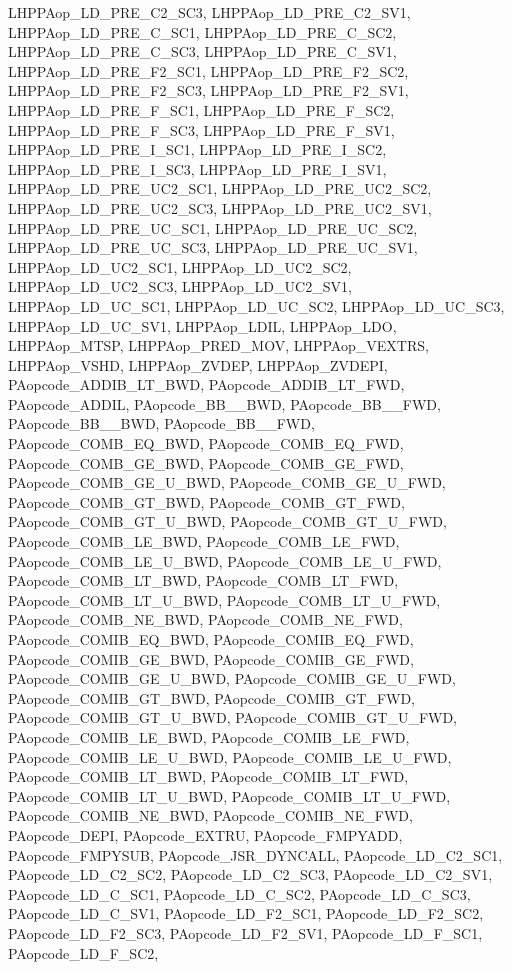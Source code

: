 LHPPAop\_\-LD\_\-PRE\_\-C2\_\-SC3, LHPPAop\_\-LD\_\-PRE\_\-C2\_\-SV1, LHPPAop\_\-LD\_\-PRE\_\-C\_\-SC1, LHPPAop\_\-LD\_\-PRE\_\-C\_\-SC2, LHPPAop\_\-LD\_\-PRE\_\-C\_\-SC3, LHPPAop\_\-LD\_\-PRE\_\-C\_\-SV1, LHPPAop\_\-LD\_\-PRE\_\-F2\_\-SC1, LHPPAop\_\-LD\_\-PRE\_\-F2\_\-SC2, LHPPAop\_\-LD\_\-PRE\_\-F2\_\-SC3, LHPPAop\_\-LD\_\-PRE\_\-F2\_\-SV1, LHPPAop\_\-LD\_\-PRE\_\-F\_\-SC1, LHPPAop\_\-LD\_\-PRE\_\-F\_\-SC2, LHPPAop\_\-LD\_\-PRE\_\-F\_\-SC3, LHPPAop\_\-LD\_\-PRE\_\-F\_\-SV1, LHPPAop\_\-LD\_\-PRE\_\-I\_\-SC1, LHPPAop\_\-LD\_\-PRE\_\-I\_\-SC2, LHPPAop\_\-LD\_\-PRE\_\-I\_\-SC3, LHPPAop\_\-LD\_\-PRE\_\-I\_\-SV1, LHPPAop\_\-LD\_\-PRE\_\-UC2\_\-SC1, LHPPAop\_\-LD\_\-PRE\_\-UC2\_\-SC2, LHPPAop\_\-LD\_\-PRE\_\-UC2\_\-SC3, LHPPAop\_\-LD\_\-PRE\_\-UC2\_\-SV1, LHPPAop\_\-LD\_\-PRE\_\-UC\_\-SC1, LHPPAop\_\-LD\_\-PRE\_\-UC\_\-SC2, LHPPAop\_\-LD\_\-PRE\_\-UC\_\-SC3, LHPPAop\_\-LD\_\-PRE\_\-UC\_\-SV1, LHPPAop\_\-LD\_\-UC2\_\-SC1, LHPPAop\_\-LD\_\-UC2\_\-SC2, LHPPAop\_\-LD\_\-UC2\_\-SC3, LHPPAop\_\-LD\_\-UC2\_\-SV1, LHPPAop\_\-LD\_\-UC\_\-SC1, LHPPAop\_\-LD\_\-UC\_\-SC2, LHPPAop\_\-LD\_\-UC\_\-SC3, LHPPAop\_\-LD\_\-UC\_\-SV1, LHPPAop\_\-LDIL, LHPPAop\_\-LDO, LHPPAop\_\-MTSP, LHPPAop\_\-PRED\_\-MOV, LHPPAop\_\-VEXTRS, LHPPAop\_\-VSHD, LHPPAop\_\-ZVDEP, LHPPAop\_\-ZVDEPI, PAopcode\_\-ADDIB\_\-LT\_\-BWD, PAopcode\_\-ADDIB\_\-LT\_\-FWD, PAopcode\_\-ADDIL, PAopcode\_\-BB\_\_\-BWD, PAopcode\_\-BB\_\_\-FWD, PAopcode\_\-BB\_\_\-BWD, PAopcode\_\-BB\_\_\-FWD, PAopcode\_\-COMB\_\-EQ\_\-BWD, PAopcode\_\-COMB\_\-EQ\_\-FWD, PAopcode\_\-COMB\_\-GE\_\-BWD, PAopcode\_\-COMB\_\-GE\_\-FWD, PAopcode\_\-COMB\_\-GE\_\-U\_\-BWD, PAopcode\_\-COMB\_\-GE\_\-U\_\-FWD, PAopcode\_\-COMB\_\-GT\_\-BWD, PAopcode\_\-COMB\_\-GT\_\-FWD, PAopcode\_\-COMB\_\-GT\_\-U\_\-BWD, PAopcode\_\-COMB\_\-GT\_\-U\_\-FWD, PAopcode\_\-COMB\_\-LE\_\-BWD, PAopcode\_\-COMB\_\-LE\_\-FWD, PAopcode\_\-COMB\_\-LE\_\-U\_\-BWD, PAopcode\_\-COMB\_\-LE\_\-U\_\-FWD, PAopcode\_\-COMB\_\-LT\_\-BWD, PAopcode\_\-COMB\_\-LT\_\-FWD, PAopcode\_\-COMB\_\-LT\_\-U\_\-BWD, PAopcode\_\-COMB\_\-LT\_\-U\_\-FWD, PAopcode\_\-COMB\_\-NE\_\-BWD, PAopcode\_\-COMB\_\-NE\_\-FWD, PAopcode\_\-COMIB\_\-EQ\_\-BWD, PAopcode\_\-COMIB\_\-EQ\_\-FWD, PAopcode\_\-COMIB\_\-GE\_\-BWD, PAopcode\_\-COMIB\_\-GE\_\-FWD, PAopcode\_\-COMIB\_\-GE\_\-U\_\-BWD, PAopcode\_\-COMIB\_\-GE\_\-U\_\-FWD, PAopcode\_\-COMIB\_\-GT\_\-BWD, PAopcode\_\-COMIB\_\-GT\_\-FWD, PAopcode\_\-COMIB\_\-GT\_\-U\_\-BWD, PAopcode\_\-COMIB\_\-GT\_\-U\_\-FWD, PAopcode\_\-COMIB\_\-LE\_\-BWD, PAopcode\_\-COMIB\_\-LE\_\-FWD, PAopcode\_\-COMIB\_\-LE\_\-U\_\-BWD, PAopcode\_\-COMIB\_\-LE\_\-U\_\-FWD, PAopcode\_\-COMIB\_\-LT\_\-BWD, PAopcode\_\-COMIB\_\-LT\_\-FWD, PAopcode\_\-COMIB\_\-LT\_\-U\_\-BWD, PAopcode\_\-COMIB\_\-LT\_\-U\_\-FWD, PAopcode\_\-COMIB\_\-NE\_\-BWD, PAopcode\_\-COMIB\_\-NE\_\-FWD, PAopcode\_\-DEPI, PAopcode\_\-EXTRU, PAopcode\_\-FMPYADD, PAopcode\_\-FMPYSUB, PAopcode\_\-JSR\_\-DYNCALL, PAopcode\_\-LD\_\-C2\_\-SC1, PAopcode\_\-LD\_\-C2\_\-SC2, PAopcode\_\-LD\_\-C2\_\-SC3, PAopcode\_\-LD\_\-C2\_\-SV1, PAopcode\_\-LD\_\-C\_\-SC1, PAopcode\_\-LD\_\-C\_\-SC2, PAopcode\_\-LD\_\-C\_\-SC3, PAopcode\_\-LD\_\-C\_\-SV1, PAopcode\_\-LD\_\-F2\_\-SC1, PAopcode\_\-LD\_\-F2\_\-SC2, PAopcode\_\-LD\_\-F2\_\-SC3, PAopcode\_\-LD\_\-F2\_\-SV1, PAopcode\_\-LD\_\-F\_\-SC1, PAopcode\_\-LD\_\-F\_\-SC2, 